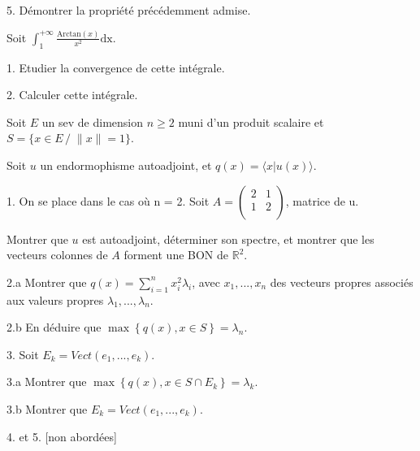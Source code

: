 \vspace{5pt}
5. Démontrer la propriété précédemment admise.


\subetoiles



\noindent Soit $\displaystyle \int_{1}^{+\infty} \frac {\mathrm{Arctan}(x)} {x^2}\mathrm{dx}$.

\vspace{5pt}
1. Etudier la convergence de cette intégrale.

\vspace{5pt}
2. Calculer cette intégrale.


\subetoiles
\columnbreak



\noindent Soit $E$ un sev de dimension $n \geqslant 2$ muni d'un produit scalaire et $S = \{x \in E \,/\; \|x\| = 1\}$.

\noindent Soit $u$ un endormophisme autoadjoint, et $q(x) = \langle x | u(x) \rangle$.

\vspace{5pt}
1. On se place dans le cas où n = 2. Soit $A =
\begin{pmatrix}
2 & 1 \\
1 & 2 \\
\end{pmatrix}
$, matrice de u.

Montrer que $u$ est autoadjoint, déterminer son spectre, et montrer que les vecteurs colonnes de $A$ forment une BON de $\mathbb{R}^2$.

\vspace{5pt}
2.a Montrer que $\displaystyle q(x) = \sum_{i = 1}^{n} x_i^2\lambda_i$,
avec $x_1, ..., x_n$ des vecteurs propres associés aux valeurs propres $\lambda_1, ..., \lambda_n$.

\vspace{5pt}
2.b En déduire que $\max\left\{q(x), x \in S\right\} = \lambda_n$.

\vspace{5pt}
3. Soit $E_k = Vect(e_1, ..., e_k)$.

\vspace{5pt}
\;\;\; 3.a Montrer que $\max \left\{q(x), x \in S \cap E_k \right\} = \lambda_k$.

\vspace{5pt}
\;\;\; 3.b Montrer que  $E_k = Vect(e_1, ..., e_k)$.

\vspace{5pt}
4. et 5. [non abordées]



